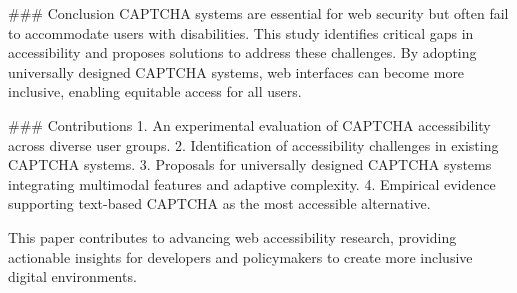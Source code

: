 ### Conclusion  
CAPTCHA systems are essential for web security but often fail to accommodate users with disabilities. This study identifies critical gaps in accessibility and proposes solutions to address these challenges. By adopting universally designed CAPTCHA systems, web interfaces can become more inclusive, enabling equitable access for all users.  

### Contributions  
1. An experimental evaluation of CAPTCHA accessibility across diverse user groups.  
2. Identification of accessibility challenges in existing CAPTCHA systems.  
3. Proposals for universally designed CAPTCHA systems integrating multimodal features and adaptive complexity.  
4. Empirical evidence supporting text-based CAPTCHA as the most accessible alternative.  

This paper contributes to advancing web accessibility research, providing actionable insights for developers and policymakers to create more inclusive digital environments.
